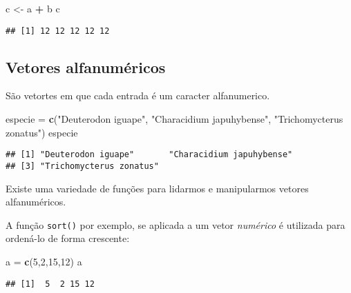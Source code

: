 \documentclass[
]{book}
\newenvironment{Shaded}{\begin{snugshade}}{\end{snugshade}}
\newcommand{\DecValTok}[1]{\textcolor[rgb]{0.00,0.00,0.81}{#1}}
\newcommand{\KeywordTok}[1]{\textcolor[rgb]{0.13,0.29,0.53}{\textbf{#1}}}
\newcommand{\NormalTok}[1]{#1}
\newcommand{\OperatorTok}[1]{\textcolor[rgb]{0.81,0.36,0.00}{\textbf{#1}}}
\newcommand{\StringTok}[1]{\textcolor[rgb]{0.31,0.60,0.02}{#1}}
\begin{document}
\begin{Shaded}
\begin{Highlighting}[]
\NormalTok{c <-}\StringTok{ }\NormalTok{a }\OperatorTok{+}\StringTok{ }\NormalTok{b}
\NormalTok{c}
\end{Highlighting}
\end{Shaded}

\begin{verbatim}
## [1] 12 12 12 12 12
\end{verbatim}

\hypertarget{vetores-alfanumuxe9ricos}{%
\subsection{Vetores alfanuméricos}\label{vetores-alfanumuxe9ricos}}

São vetortes em que cada entrada é um caracter alfanumerico.

\begin{Shaded}
\begin{Highlighting}[]
\NormalTok{especie =}\StringTok{ }\KeywordTok{c}\NormalTok{(}\StringTok{"Deuterodon iguape"}\NormalTok{, }
            \StringTok{"Characidium japuhybense"}\NormalTok{, }
            \StringTok{"Trichomycterus zonatus"}\NormalTok{)}
\NormalTok{especie}
\end{Highlighting}
\end{Shaded}

\begin{verbatim}
## [1] "Deuterodon iguape"       "Characidium japuhybense"
## [3] "Trichomycterus zonatus"
\end{verbatim}

Existe uma variedade de funções para lidarmos e manipularmos vetores alfanuméricos.

A função \texttt{sort()} por exemplo, se aplicada a um vetor \emph{numérico} é utilizada para ordená-lo de forma crescente:

\begin{Shaded}
\begin{Highlighting}[]
\NormalTok{a =}\StringTok{ }\KeywordTok{c}\NormalTok{(}\DecValTok{5}\NormalTok{,}\DecValTok{2}\NormalTok{,}\DecValTok{15}\NormalTok{,}\DecValTok{12}\NormalTok{)}
\NormalTok{a}
\end{Highlighting}
\end{Shaded}

\begin{verbatim}
## [1]  5  2 15 12
\end{verbatim}
\end{document}
